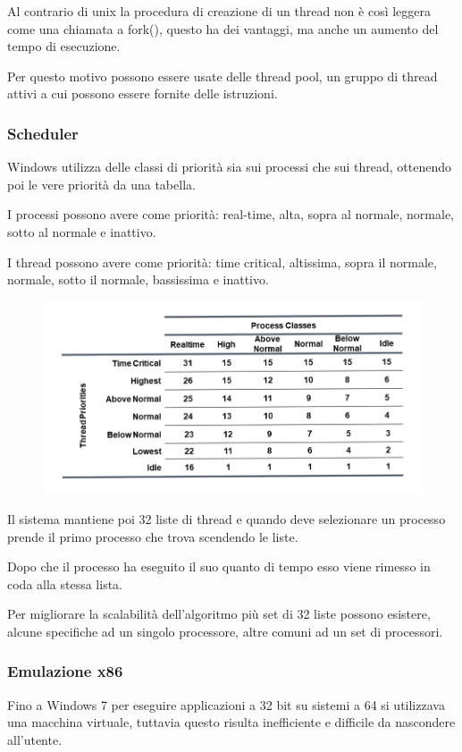 Al contrario di unix la procedura di creazione di un thread non è così leggera come una chiamata a fork(), questo ha dei vantaggi, ma anche un aumento del tempo di esecuzione.

Per questo motivo possono essere usate delle thread pool, un gruppo di thread attivi a cui possono essere fornite delle istruzioni.

\subsubsection{Scheduler}
Windows utilizza delle classi di priorità sia sui processi che sui thread, ottenendo poi le vere priorità da una tabella.

I processi possono avere come priorità: real-time, alta, sopra al normale, normale, sotto al normale e inattivo.

I thread possono avere come priorità: time critical, altissima, sopra il normale, normale, sotto il normale, bassissima e inattivo.

\begin{figure}[H]
    \centering
    \includegraphics[width=0.75\linewidth]{assets/Windows-priority.png}
\end{figure}

Il sistema mantiene poi 32 liste di thread e quando deve selezionare un processo prende il primo processo che trova scendendo le liste.

Dopo che il processo ha eseguito il suo quanto di tempo esso viene rimesso in coda alla stessa lista.

\spacer
Per migliorare la scalabilità dell'algoritmo più set di 32 liste possono esistere, alcune specifiche ad un singolo processore, altre comuni ad un set di processori.

\subsubsection{Emulazione x86}
Fino a Windows 7 per eseguire applicazioni a 32 bit su sistemi a 64 si utilizzava una macchina virtuale, tuttavia questo risulta inefficiente e difficile da nascondere all'utente.

